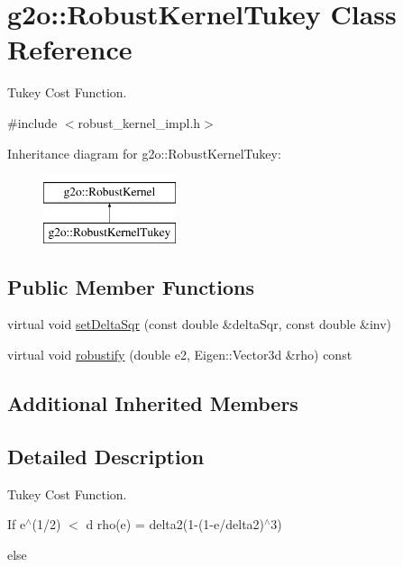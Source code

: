 \hypertarget{classg2o_1_1_robust_kernel_tukey}{}\section{g2o\+:\+:Robust\+Kernel\+Tukey Class Reference}
\label{classg2o_1_1_robust_kernel_tukey}


Tukey Cost Function.  




{\ttfamily \#include $<$robust\+\_\+kernel\+\_\+impl.\+h$>$}

Inheritance diagram for g2o\+:\+:Robust\+Kernel\+Tukey\+:\begin{figure}[H]
\begin{center}
\leavevmode
\includegraphics[height=2.000000cm]{classg2o_1_1_robust_kernel_tukey}
\end{center}
\end{figure}
\subsection*{Public Member Functions}
\begin{DoxyCompactItemize}
\item 
virtual void \mbox{\hyperlink{classg2o_1_1_robust_kernel_tukey_a0602ba130364506d65fb86f3473209aa}{set\+Delta\+Sqr}} (const double \&delta\+Sqr, const double \&inv)
\item 
virtual void \mbox{\hyperlink{classg2o_1_1_robust_kernel_tukey_a415fbc0b4033a8330700e66c60305b13}{robustify}} (double e2, Eigen\+::\+Vector3d \&rho) const
\end{DoxyCompactItemize}
\subsection*{Additional Inherited Members}


\subsection{Detailed Description}
Tukey Cost Function. 

If e$^\wedge$(1/2) $<$ d rho(e) = delta2(1-\/(1-\/e/delta2)$^\wedge$3)

else

